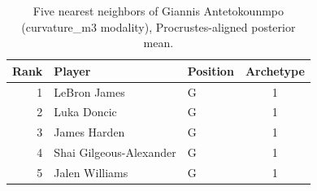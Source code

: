 \begin{table}[htbp]
  \centering\small
  \begin{tabular}{rllc}
    \toprule
    Rank & Player & Position & Archetype \\
    \midrule
    1 & LeBron James & G & 1 \\
    2 & Luka Doncic & G & 1 \\
    3 & James Harden & G & 1 \\
    4 & Shai Gilgeous-Alexander & G & 1 \\
    5 & Jalen Williams & G & 1 \\
    \bottomrule
  \end{tabular}
  \caption{Five nearest neighbors of Giannis Antetokounmpo (curvature_m3 modality), Procrustes-aligned posterior mean.}
  \label{tab:Giannis_Antetokounmpo_neighbors_curvature_m3}
\end{table}

